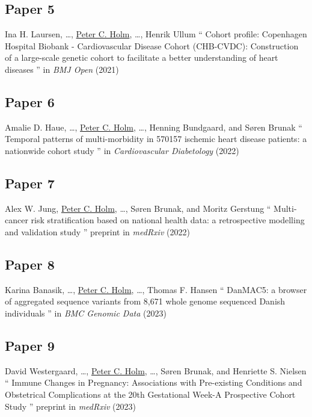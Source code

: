 \subsection{Paper 5}
Ina H. Laursen, \ldots, 
\underline{Peter C. Holm},
\ldots, Henrik Ullum
\enquote{%
    Cohort profile: Copenhagen Hospital Biobank - Cardiovascular Disease Cohort
    (CHB-CVDC): Construction of a large-scale genetic cohort to facilitate a
    better understanding of heart diseases
}
in \textit{BMJ Open} (2021)

\subsection{Paper 6}
Amalie D. Haue, \ldots, 
\underline{Peter C. Holm},
\ldots, Henning Bundgaard, and Søren Brunak
\enquote{%
    Temporal patterns of multi-morbidity in 
    570157 ischemic heart disease patients: 
    a nationwide cohort study
}
in \textit{Cardiovascular Diabetology} (2022)

\subsection{Paper 7}
Alex W. Jung, 
\underline{Peter C. Holm}, \ldots, 
Søren Brunak, and 
Moritz Gerstung
\enquote{%
    Multi-cancer risk stratification based on national health data: a
    retrospective modelling and validation study
}
preprint in \textit{medRxiv} (2022)

\subsection{Paper 8}
Karina Banasik, \ldots, 
\underline{Peter C. Holm}, \ldots, 
Thomas F. Hansen
\enquote{%
    DanMAC5: a browser of aggregated sequence variants from 8,671 whole genome
    sequenced Danish individuals
}
in \textit{BMC Genomic Data} (2023)

\subsection{Paper 9}
David Westergaard, \ldots, 
\underline{Peter C. Holm}, \ldots, 
Søren Brunak, and 
Henriette S. Nielsen
\enquote{%
    Immune Changes in Pregnancy: Associations with Pre-existing Conditions and
    Obstetrical Complications at the 20th Gestational Week-A Prospective Cohort
    Study
}
preprint in \textit{medRxiv} (2023)

